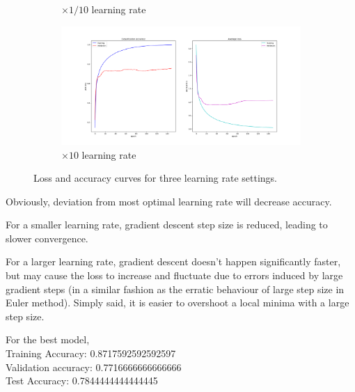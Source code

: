 \documentclass{article} %
\begin{document}
\begin{figure}[H]
\begin{subfigure}[b]{0.49\textwidth}
            \caption{$\times1/10$ learning rate}
        \end{subfigure}
        \begin{subfigure}[b]{0.49\textwidth}
        \includegraphics[width=\textwidth]{3,1,2 x1 graph.png}
            \caption{$\times10$ learning rate}
        \end{subfigure}
        \caption{Loss and accuracy curves for three learning rate settings.}
        \label{q312}
    \end{figure}

    Obviously, deviation from most optimal learning rate will decrease accuracy. 
    \medskip

    For a smaller learning rate, gradient descent step size is reduced, leading to slower convergence.
    \medskip

    For a larger learning rate, gradient descent doesn't happen significantly faster, but may cause the loss to increase and fluctuate due to errors induced by large gradient steps (in a similar fashion as the erratic behaviour of large step size in Euler method). Simply said, it is easier to overshoot a local minima with a large step size.
    \medskip
    
    For the best model, \\
    Training Accuracy:  0.8717592592592597 \\
    Validation accuracy:  0.7716666666666666 \\
    Test Accuracy:  0.7844444444444445 
\end{document}
